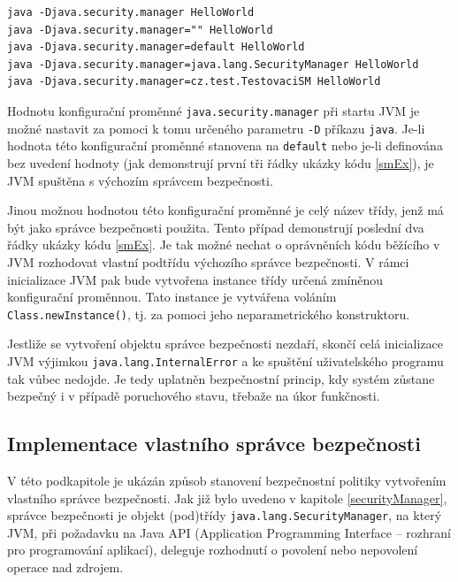 \begin{lstlisting}[caption=Příkazy spouštějící program s výchozím správcem bezpečnosti, label=smEx]
java -Djava.security.manager HelloWorld
java -Djava.security.manager="" HelloWorld
java -Djava.security.manager=default HelloWorld
java -Djava.security.manager=java.lang.SecurityManager HelloWorld
java -Djava.security.manager=cz.test.TestovaciSM HelloWorld
\end{lstlisting}

Hodnotu konfigurační proměnné {\tt java.security.manager} při startu JVM je možné nastavit za pomoci k tomu určeného parametru {\tt -D} příkazu {\tt java}.
Je-li hodnota této konfigurační proměnné stanovena na {\tt default} nebo je-li definována bez uvedení hodnoty
(jak demonstrují první tři řádky ukázky kódu \ref{smEx}), je JVM spuštěna s výchozím správcem bezpečnosti.
\cite{javaSecurityArch}

Jinou možnou hodnotou této konfigurační proměnné je celý název třídy, jenž má být jako správce bezpečnosti použita.
Tento případ demonstrují poslední dva řádky ukázky kódu \ref{smEx}.
Je tak možné nechat o oprávněních kódu běžícího v JVM rozhodovat vlastní podtřídu výchozího správce bezpečnosti.
V rámci inicializace JVM pak bude vytvořena instance třídy určená zmíněnou konfigurační proměnnou.
Tato instance je vytvářena voláním {\tt Class.newInstance()}, tj. za pomoci jeho neparametrického konstruktoru.

Jestliže se vytvoření objektu správce bezpečnosti nezdaří, skončí celá inicializace JVM výjimkou {\tt java.lang.InternalError} \cite{sourceLauncher} a ke spuštění uživatelského programu tak vůbec nedojde.
Je tedy uplatněn bezpečnostní princip, kdy systém zůstane bezpečný i v případě poruchového stavu, třebaže na úkor funkčnosti.

\subsection{Implementace vlastního správce bezpečnosti} \label{vlastniSM}

V této podkapitole je ukázán způsob stanovení bezpečnostní politiky vytvořením vlastního správce bezpečnosti.
Jak již bylo uvedeno v kapitole \ref{securityManager}, správce bezpečnosti je objekt (pod)třídy {\tt java.lang.SecurityManager},
na který JVM, při požadavku na Java API (Application Programming Interface -- rozhraní pro programování aplikací), deleguje rozhodnutí o povolení nebo nepovolení operace nad zdrojem.

